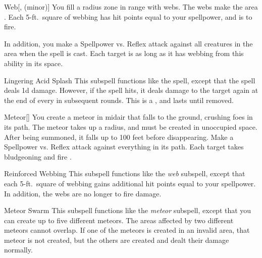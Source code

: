 \begin{ability}[\nth{3}]{Web}[,  (minor)]
You fill a \areasmall radius zone in \rngclose range with webs.
The webs make the area .
Each 5-ft.\ square of webbing has hit points equal to your spellpower, and is  to fire.

In addition, you make a Spellpower vs. Reflex attack against all creatures in the area when the spell is cast.
\hit Each target is \immobilized as long as it has webbing from this ability in its space.
\end{ability}
\vspace{0.25em}


\begin{ability}[\nth{5}]{Lingering Acid Splash}
This subspell functions like the  spell, except that the spell deals \minus1d damage.
However, if the spell hits, it deals damage to the target again at the end of every  in subsequent rounds.
This is a , and lasts until removed.
\end{ability}
\vspace{0.25em}


\begin{ability}[\nth{5}]{Meteor}[]
You create a meteor in midair that falls to the ground, crushing foes in its path.
The meteor takes up a \areamed radius, and must be created in unoccupied space.
After being summoned, it falls up to 100 feet before disappearing.
Make a Spellpower vs. Reflex attack against everything in its path.
\hit Each target takes bludgeoning and fire .
\end{ability}
\vspace{0.25em}


\begin{ability}[\nth{5}]{Reinforced Webbing}
This subspell functions like the \textit{web} subspell, except that each 5-ft.\ square of webbing gains additional hit points equal to your spellpower.
In addition, the webs are no longer  to fire damage.
\end{ability}
\vspace{0.25em}


\begin{ability}[\nth{8}]{Meteor Swarm}
This subspell functions like the \textit{meteor} subspell, except that you can create up to five different meteors.
The areas affected by two different meteors cannot overlap.
If one of the meteors is created in an invalid area, that meteor is not created, but the others are created and dealt their damage normally.
\end{ability}
\vspace{0.25em}

